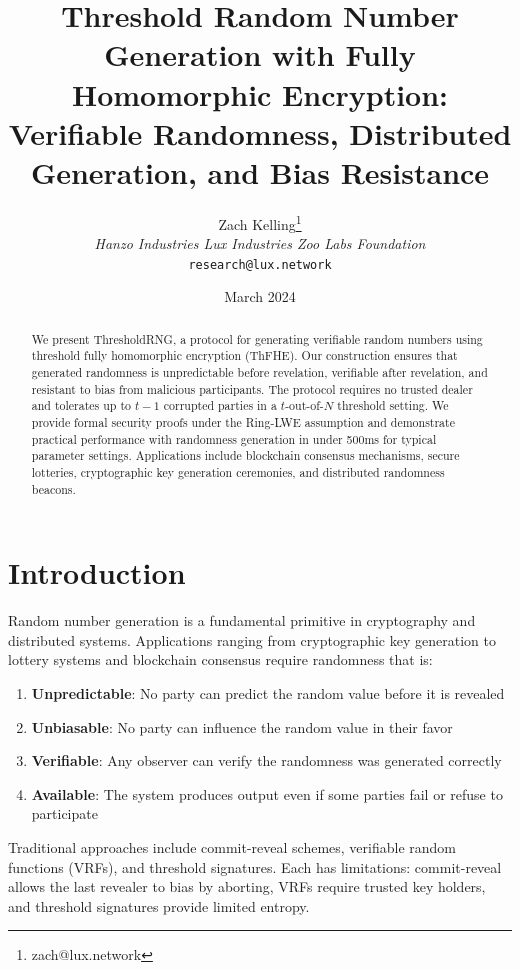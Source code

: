 \documentclass[11pt,a4paper]{article}
\title{Threshold Random Number Generation with Fully Homomorphic Encryption:\\Verifiable Randomness, Distributed Generation, and Bias Resistance}
\author{Zach Kelling\thanks{zach@lux.network} \\ \textit{Hanzo Industries \quad Lux Industries \quad Zoo Labs Foundation} \\ \texttt{research@lux.network}}
\date{March 2024}
\begin{document}
\maketitle

\begin{abstract}
We present ThresholdRNG, a protocol for generating verifiable random numbers using threshold fully homomorphic encryption (ThFHE). Our construction ensures that generated randomness is unpredictable before revelation, verifiable after revelation, and resistant to bias from malicious participants. The protocol requires no trusted dealer and tolerates up to $t-1$ corrupted parties in a $t$-out-of-$N$ threshold setting. We provide formal security proofs under the Ring-LWE assumption and demonstrate practical performance with randomness generation in under 500ms for typical parameter settings. Applications include blockchain consensus mechanisms, secure lotteries, cryptographic key generation ceremonies, and distributed randomness beacons.
\end{abstract}

\section{Introduction}

Random number generation is a fundamental primitive in cryptography and distributed systems. Applications ranging from cryptographic key generation to lottery systems and blockchain consensus require randomness that is:

\begin{enumerate}
    \item \textbf{Unpredictable}: No party can predict the random value before it is revealed
    \item \textbf{Unbiasable}: No party can influence the random value in their favor
    \item \textbf{Verifiable}: Any observer can verify the randomness was generated correctly
    \item \textbf{Available}: The system produces output even if some parties fail or refuse to participate
\end{enumerate}

Traditional approaches include commit-reveal schemes, verifiable random functions (VRFs), and threshold signatures. Each has limitations: commit-reveal allows the last revealer to bias by aborting, VRFs require trusted key holders, and threshold signatures provide limited entropy.
\end{document}
